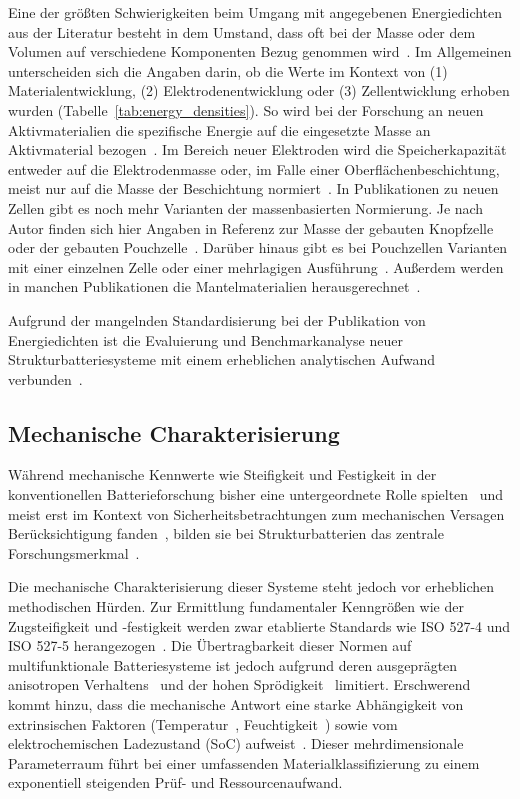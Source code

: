 Eine der größten Schwierigkeiten beim Umgang mit angegebenen Energiedichten aus der Literatur besteht in dem Umstand, dass oft bei der Masse oder dem Volumen auf verschiedene Komponenten Bezug genommen wird~\cite{Son2021}. Im Allgemeinen unterscheiden sich die Angaben darin, ob die Werte im Kontext von (1) Materialentwicklung, (2) Elektrodenentwicklung oder (3) Zellentwicklung
erhoben wurden (Tabelle~\ref{tab:energy_densities}).
So wird bei der Forschung an neuen Aktivmaterialien die spezifische Energie auf die eingesetzte Masse an Aktivmaterial bezogen~\cite{Son2021}. Im Bereich neuer Elektroden wird die Speicherkapazität entweder auf die Elektrodenmasse oder, im Falle einer Oberflächenbeschichtung, meist nur auf die Masse der Beschichtung normiert~\cite{Greenhalgh2023}. In Publikationen zu neuen Zellen gibt es noch mehr Varianten der massenbasierten Normierung. Je nach Autor finden sich hier Angaben in Referenz zur Masse der gebauten Knopfzelle oder der gebauten Pouchzelle~\cite{Akimoto1998,Liu2018}. Darüber hinaus gibt es bei Pouchzellen Varianten mit einer einzelnen Zelle oder einer mehrlagigen Ausführung~\cite{Schmuch2018}. Außerdem werden in manchen Publikationen die Mantelmaterialien herausgerechnet~\cite{Greenhalgh2023}.

Aufgrund der mangelnden Standardisierung bei der Publikation von Energiedichten ist die Evaluierung und Benchmarkanalyse neuer Strukturbatteriesysteme mit einem erheblichen analytischen Aufwand verbunden~\cite{Greenhalgh2023, Zschiebsch2024}.

\subsection{Mechanische Charakterisierung}
Während mechanische Kennwerte wie Steifigkeit und Festigkeit in der konventionellen Batterieforschung bisher eine untergeordnete Rolle spielten~\cite{Chen2024a} und meist erst im Kontext von Sicherheitsbetrachtungen zum mechanischen Versagen Berücksichtigung fanden~\cite{Zhu2023}, bilden sie bei Strukturbatterien das zentrale Forschungsmerkmal~\cite{Asp2021}.

Die mechanische Charakterisierung dieser Systeme steht jedoch vor erheblichen methodischen Hürden. Zur Ermittlung fundamentaler Kenngrößen wie der Zugsteifigkeit und -festigkeit werden zwar etablierte Standards wie ISO 527-4 und ISO 527-5 herangezogen~\cite{ISO527-4-2023, ISO527-5-2021, Xu2022, Liu2022a}. Die Übertragbarkeit dieser Normen auf multifunktionale Batteriesysteme ist jedoch aufgrund deren ausgeprägten anisotropen Verhaltens~\cite{Carlstedt2020b} und der hohen Sprödigkeit~\cite{Kalnin1982} limitiert. Erschwerend kommt hinzu, dass die mechanische Antwort eine starke Abhängigkeit von extrinsischen Faktoren (Temperatur~\cite{Carlstedt2019a}, Feuchtigkeit~\cite{Kosfeld2023}) sowie vom elektrochemischen Ladezustand (SoC) aufweist~\cite{Qi2010, Duan2021}. Dieser mehrdimensionale Parameterraum führt bei einer umfassenden Materialklassifizierung zu einem exponentiell steigenden Prüf- und Ressourcenaufwand.


